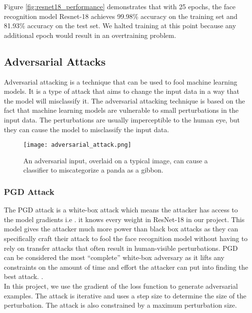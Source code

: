 Figure \ref{fig:resnet18_performance} demonstrates that with 25 epochs, the face recognition model Resnet-18 achieves 99.98\% accuracy on the training set and 81.93\% accuracy on the test set. We halted training at this point because any additional epoch would result in an overtraining problem.

\subsection{Adversarial Attacks}


Adversarial attacking is a technique that can be used to fool machine learning models. It is a type of attack that aims to change the input data in a way that the model will misclassify it. The adversarial attacking technique is based on the fact that machine learning models are vulnerable to small perturbations in the input data. The perturbations are usually imperceptible to the human eye, but they can cause the model to misclassify the input data. \cite{adversarial_2020}

\begin{figure}[h]
    \centering
    \texttt{[image: adversarial\_attack.png]}
    \caption{An adversarial input, overlaid on a typical image, can cause a classifier to miscategorize a panda as a gibbon.}
    \label{fig:adversarial_attack}
\end{figure}

\subsubsection{PGD Attack}

The PGD attack is a white-box attack which means the attacker has access to the model gradients i.e \cite{madry2017towards}. it knows every weight in ResNet-18 in our project. This model gives the attacker much more power than black box attacks as they can specifically craft their attack to fool the face recognition model without having to rely on transfer attacks that often result in human-visible perturbations. PGD can be considered the most “complete” white-box adversary as it lifts any constraints on the amount of time and effort the attacker can put into finding the best attack. \cite{knagg_2019}. \\

In this project, we use the gradient of the loss function to generate adversarial examples. The attack is iterative and uses a step size to determine the size of the perturbation. The attack is also constrained by a maximum perturbation size.

